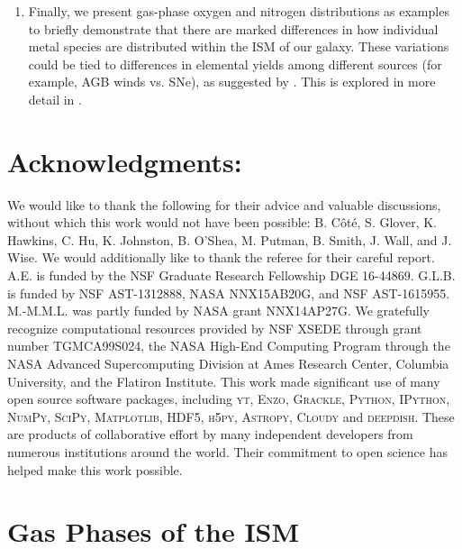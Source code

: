 \begin{enumerate}
\item Finally, we present gas-phase oxygen and nitrogen distributions as examples to briefly demonstrate that there are marked differences in how individual metal species are distributed within the ISM of our galaxy. These variations could be tied to differences in elemental yields among different sources (for example, AGB winds vs. SNe), as suggested by \cite{KrumholzTing2018}. This is explored in more detail in \citep{Emerick2018b}.
\end{enumerate}

\section*{Acknowledgments:}
We would like to thank the following for their advice and valuable discussions, without which this work would not have been possible: B. C\^ot\'e, S. Glover, K. Hawkins, C. Hu, K. Johnston, B. O'Shea, M. Putman, B. Smith, J. Wall, and J. Wise. We would additionally like to thank the referee for their careful report. A.E. is funded by the NSF Graduate Research Fellowship DGE 16-44869. G.L.B. is funded by NSF AST-1312888, NASA NNX15AB20G, and NSF AST-1615955. M.-M.M.L. was partly funded by NASA  grant NNX14AP27G. We gratefully recognize computational resources provided by NSF XSEDE through grant number TGMCA99S024, the NASA High-End Computing Program through the NASA Advanced Supercomputing Division at Ames Research Center, Columbia University, and the Flatiron Institute. This work made significant use of many open source software packages, including \textsc{yt}, \textsc{Enzo}, \textsc{Grackle}, \textsc{Python}, \textsc{IPython}, \textsc{NumPy}, \textsc{SciPy}, \textsc{Matplotlib}, \textsc{HDF5}, \textsc{h5py}, \textsc{Astropy}, \textsc{Cloudy} and \textsc{deepdish}. These are products of collaborative effort by many independent developers from numerous institutions around the world. Their commitment to open science has helped make this work possible.

%
%
%


\setcounter{section}{0}%
\renewcommand\thesection{\thechapter.\Alph{section}}

\section{Gas Phases of the ISM}
\label{appendix:phases}

